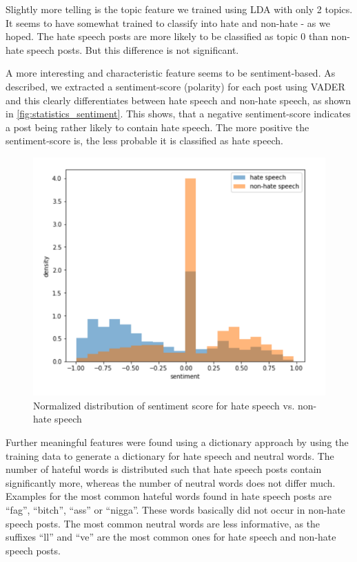 Slightly more telling is the topic feature we trained using LDA with only 2 topics. It seems to have somewhat trained to classify into hate and non-hate - as we hoped. The hate speech posts are more likely to be classified as topic 0 than non-hate speech posts. But this difference is not significant.

\vspace{0.5cm}

A more interesting and characteristic feature seems to be sentiment-based. As described, we extracted a sentiment-score (polarity) for each post using VADER and this clearly differentiates between hate speech and non-hate speech, as shown in \autoref{fig:statistics_sentiment}.
This shows, that a negative sentiment-score indicates a post being rather likely to contain hate speech. The more positive the sentiment-score is, the less probable it is classified as hate speech.

\begin{figure}[ht]
	\centering
	\includegraphics[width=0.7\linewidth]{figures/statistics_sentiment.png}
	\caption{Normalized distribution of sentiment score for hate speech vs. non-hate speech}
	\label{fig:statistics_sentiment}
\end{figure}

Further meaningful features were found using a dictionary approach by using the training data to generate a dictionary for hate speech and neutral words. The number of hateful words is distributed such that hate speech posts contain significantly more, whereas the number of neutral words does not differ much.
Examples for the most common hateful words found in hate speech posts are \enquote{fag}, \enquote{bitch}, \enquote{ass} or \enquote{nigga}. These words basically did not occur in non-hate speech posts. The most common neutral words are less informative, as the suffixes \enquote{ll} and \enquote{ve} are the most common ones for hate speech and non-hate speech posts.

